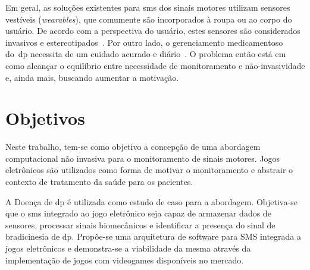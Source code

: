 

Em geral, as soluções existentes para \ac{sms} dos sinais motores utilizam sensores vestíveis (\textit{wearables}), que comumente são incorporados à roupa ou ao corpo do usuário. De acordo com a perspectiva do usuário, estes sensores são considerados invasivos e estereotipados~\cite{aarhus_negotiating_2010}. Por outro lado, o gerenciamento medicamentoso do~\ac{dp} necessita de um cuidado acurado e diário~\cite{quantitativeparkinson2011}. O problema então está em como alcançar o equilíbrio entre necessidade de monitoramento e não-invasividade e, ainda mais, buscando aumentar a motivação.

\section{Objetivos}
Neste trabalho, tem-se como objetivo a concepção de uma abordagem computacional não invasiva para o monitoramento de sinais motores. Jogos eletrônicos são utilizados como forma de motivar o monitoramento e abstrair o contexto de tratamento da saúde para os pacientes.

A Doença de \ac{dp} é utilizada como estudo de caso para a abordagem. Objetiva-se que o \ac{sms} integrado ao jogo eletrônico seja capaz de armazenar dados de sensores, processar sinais biomecânicos e identificar a presença do sinal de bradicinesia de \ac{dp}. Propõe-se uma arquitetura de software para SMS integrada a jogos eletrônicos e demonstra-se a viabilidade da mesma através da implementação de jogos com videogames disponíveis no mercado. 

